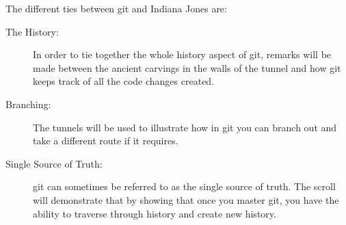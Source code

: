 The different ties between \gls{git} and Indiana Jones are:
\begin{description}
	\item[The History:] In order to tie together the whole history aspect of \gls{git}, remarks will be made between the ancient carvings in the walls of the tunnel and how \gls{git} keeps track of all the code changes created.
	\item[Branching:] The tunnels will be used to illustrate how in \gls{git} you can branch out and take a different route if it requires.
	\item[Single Source of Truth:] \Gls{git} can sometimes be referred to as the single source of truth. The scroll will demonstrate that by showing that once you master \gls{git}, you have the ability to traverse through history and create new history.
\end{description}





